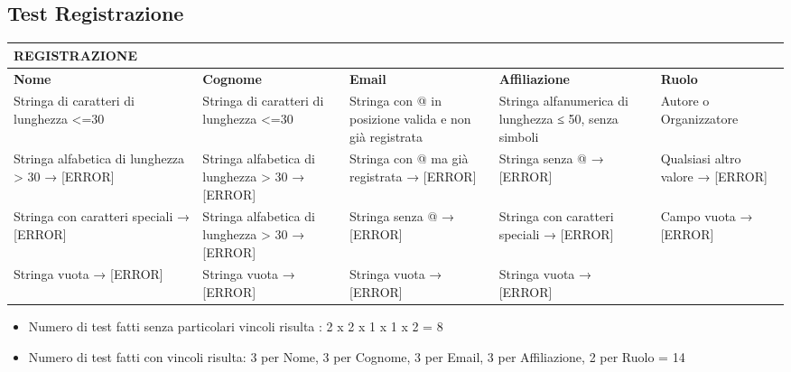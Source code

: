 \subsection{Test Registrazione}
\label{sec:test_registrazione}

\begin{tabular}{|p{3.5cm}|p{2cm}|p{2cm}|p{2cm}|p{2cm}|}
\hline
\rowcolor{SkyBlue}
\textbf{REGISTRAZIONE} & & & &\\
\hline
\rowcolor{Red}
\textbf{Nome} & \textbf{Cognome} & \textbf{Email} & \textbf{Affiliazione} & \textbf{Ruolo}  \\

Stringa di caratteri di lunghezza <=30 & Stringa di caratteri di lunghezza <=30 & Stringa con @ in posizione valida e non già registrata &  Stringa alfanumerica di lunghezza ≤ 50, senza simboli & Autore o Organizzatore \\

Stringa alfabetica di lunghezza > 30 → [ERROR] & Stringa alfabetica di lunghezza > 30 → [ERROR] & Stringa con @ ma già registrata → [ERROR] & Stringa senza @ → [ERROR] & Qualsiasi altro valore → [ERROR] \\

Stringa con caratteri speciali → [ERROR] & Stringa alfabetica di lunghezza > 30 → [ERROR] & Stringa senza @ → [ERROR] & Stringa con caratteri speciali → [ERROR] & Campo vuota → [ERROR]  \\

Stringa vuota → [ERROR] & Stringa vuota → [ERROR] & Stringa vuota → [ERROR] & Stringa vuota → [ERROR] &\\
\hline
\end{tabular}

\begin{itemize}
\item Numero di test fatti senza particolari vincoli risulta : 2 x 2 x 1 x 1 x 2 = 8
\item  Numero di test fatti con vincoli risulta: 3 per Nome, 3 per Cognome, 3 per Email, 3 per Affiliazione, 2 per Ruolo = 14 
\end{itemize}


